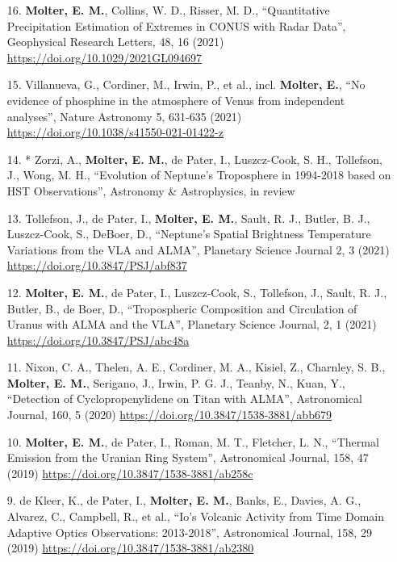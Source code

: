 \documentclass[margin, 10pt]{res} %
\begin{document}
\begin{resume}
{\begin{enumerate}
\item[16.] {\bf Molter, E. M.}, Collins, W. D., Risser, M. D., ``Quantitative Precipitation Estimation of Extremes in CONUS with Radar Data'', Geophysical Research Letters, 48, 16 (2021) \url{https://doi.org/10.1029/2021GL094697}

\item[15.] Villanueva, G., Cordiner, M., Irwin, P., et al., incl. {\bf Molter, E.}, ``No evidence of phosphine in the atmosphere of Venus from independent analyses'', Nature Astronomy 5, 631-635 (2021) \url{https://doi.org/10.1038/s41550-021-01422-z}

\item[14.]* Zorzi, A., {\bf Molter, E. M.}, de Pater, I., Luszcz-Cook, S. H., Tollefson, J., Wong, M. H., ``Evolution of Neptune's Troposphere in 1994-2018 based on HST Observations'', Astronomy \& Astrophysics, in review 

\item[13.] Tollefson, J., de Pater, I., {\bf Molter, E. M.}, Sault, R. J., Butler, B. J., Luszcz-Cook, S., DeBoer, D., ``Neptune's Spatial Brightness Temperature Variations from the VLA and ALMA'', Planetary Science Journal 2, 3 (2021) \url{https://doi.org/10.3847/PSJ/abf837}

\item[12.] {\bf Molter, E. M.}, de Pater, I., Luszcz-Cook, S., Tollefson, J., Sault, R. J., Butler, B., de Boer, D., ``Tropospheric Composition and Circulation of Uranus with ALMA and the VLA'', Planetary Science Journal, 2, 1 (2021) \url{https://doi.org/10.3847/PSJ/abc48a}

\item[11.] Nixon, C. A., Thelen, A. E., Cordiner, M. A., Kisiel, Z., Charnley, S. B., {\bf Molter, E. M.}, Serigano, J., Irwin, P. G. J., Teanby, N., Kuan, Y., ``Detection of Cyclopropenylidene on Titan with ALMA'', Astronomical Journal, 160, 5 (2020) \url{https://doi.org/10.3847/1538-3881/abb679}

\item[10.] {\bf Molter, E. M.}, de Pater, I., Roman, M. T., Fletcher, L. N., ``Thermal Emission from the Uranian Ring System'', Astronomical Journal, 158, 47 (2019) \url{https://doi.org/10.3847/1538-3881/ab258c}

\item[9.] de Kleer, K., de Pater, I., {\bf Molter, E. M.}, Banks, E., Davies, A. G., Alvarez, C., Campbell, R., et al., ``Io's Volcanic Activity from Time Domain Adaptive Optics Observations: 2013-2018'', Astronomical Journal, 158, 29 (2019) \url{https://doi.org/10.3847/1538-3881/ab2380}


\end{enumerate}}
\end{resume}
\end{document}

